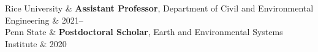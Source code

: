 
\newplace Rice University & \textbf{Assistant Professor}, Department of Civil and Environmental Engineering & 2021-- \\

\newplace Penn State & \textbf{Postdoctoral Scholar}, Earth and Environmental Systems Institute & 2020 \\

